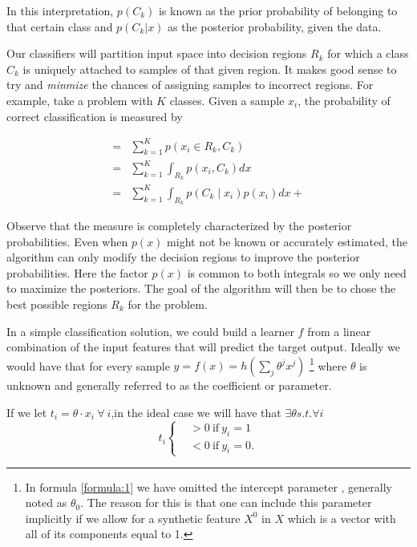 In this interpretation, $p(C_k)$ is known as the prior probability of belonging to that certain class and $p(C_k|x)$ as the posterior probability, given the data.   

Our classifiers will partition input space into decision regions $R_k$ for which a class $C_k$ is uniquely attached to samples of that given region. It makes good sense to try and \textit{minmize} the chances of assigning samples to incorrect regions. For example, take a problem with $K$ classes. Given a sample $x_i$, the probability of correct classification is measured by 

\begin{equation}
\begin{split}
=  & \sum_{k=1}^{K} p(x_i \in R_k, C_k )  \\
=  & \sum_{k=1}^{K} \int_{R_k}p(x_i,C_k) dx \\
=  & \sum_{k=1}^{K} \int_{R_k}p(C_k \mid x_i) p(x_i) dx + 
\end{split}
\end{equation}

Observe that the measure is completely characterized by the posterior probabilities. Even when $p(x)$ might not be known or accurately estimated, the algorithm can only modify the decision regions to improve the posterior probabilities. Here the factor $p(x)$ is common to both integrals so we only need to maximize the posteriors. The goal of the algorithm will then be to chose the best possible regions $R_k$ for the problem.
 
In a simple classification solution, we could build a learner $f$ from a linear combination of the input features that will predict the target output. Ideally we would have that for every sample $y = f(x) = h\left(\sum_{j}\theta^jx^j\right)$ \label{formula:1} \footnote{In formula \ref{formula:1} we have omitted the intercept parameter , generally noted as $\theta_0$. The reason for this is that one can include this parameter implicitly if we allow for a synthetic feature $X^0$ in $X$ which is a vector with all of its components equal to 1.  } where $\theta$ is unknown and generally referred to as the coefficient or parameter. 

If we let $ t_i = \theta \cdot x_i  \ \forall \ i $,in the ideal case we will have that $\exists \theta s.t. \forall i $ 
\[
    t_i
      \begin{cases}
        &>0 \ \mbox{if} \ y_i=1 \\
        &<0 \ \mbox{if} \ y_i=0.
      \end{cases}
    \]

